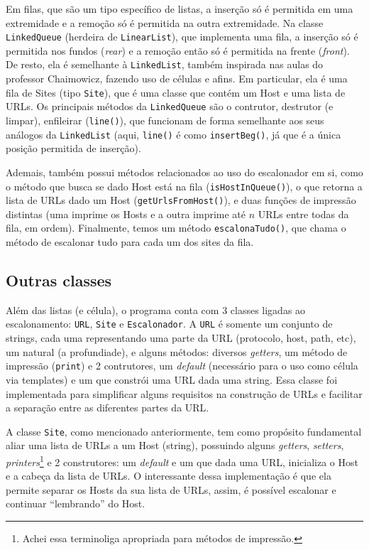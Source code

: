 \documentclass{article}
\def\code#1{\texttt{#1}}
\begin{document}
Em filas, que são um tipo específico de listas, a inserção só é permitida em uma extremidade e a remoção só é permitida na outra extremidade. Na classe \code{LinkedQueue} (herdeira de \code{LinearList}), que implementa uma fila, a inserção só é permitida nos fundos (\textit{rear}) e a remoção então só é permitida na frente (\textit{front}). De resto, ela é semelhante à \code{LinkedList}, também inspirada nas aulas do professor Chaimowicz, fazendo uso de células e afins. Em particular, ela é uma fila de Sites (tipo \code{Site}), que é uma classe que contém um Host e uma lista de URLs. Os principais métodos da \code{LinkedQueue} são o contrutor, destrutor (e limpar), enfileirar (\code{line()}), que funcionam de forma semelhante aos seus análogos da \code{LinkedList} (aqui, \code{line()} é como \code{insertBeg()}, já que é a única posição permitida de inserção).

Ademais, também possui métodos relacionados ao uso do escalonador em si, como o método que busca se dado Host está na fila (\code{isHostInQueue()}), o que retorna a lista de URLs dado um Host (\code{getUrlsFromHost()}), e duas funções de impressão distintas (uma imprime os Hosts e a outra imprime até \( n \) URLs entre todas da fila, em ordem). Finalmente, temos um método \code{escalonaTudo()}, que chama o método de escalonar tudo para cada um dos sites da fila.

\subsection{Outras classes}

Além das listas (e célula), o programa conta com 3 classes ligadas ao escalonamento: \code{URL}, \code{Site} e \code{Escalonador}. A \code{URL} é somente um conjunto de strings, cada uma representando uma parte da URL (protocolo, host, path, etc), um natural (a profundiade), e alguns métodos: diversos \textit{getters}, um método de impressão (\code{print}) e 2 contrutores, um \textit{default} (necessário para o uso como célula via templates) e um que constrói uma URL dada uma string. Essa classe foi implementada para simplificar alguns requisitos na construção de URLs e facilitar a separação entre as diferentes partes da URL.

A classe \code{Site}, como mencionado anteriormente, tem como propósito fundamental aliar uma lista de URLs a um Host (string), possuindo alguns \textit{getters}, \textit{setters}, \textit{printers}\footnote{Achei essa terminoliga apropriada para métodos de impressão.} e 2 construtores: um \textit{default} e um que dada uma URL, inicializa o Host e a cabeça da lista de URLs. O interessante dessa implementação é que ela permite separar os Hosts da sua lista de URLs, assim, é possível escalonar e continuar ``lembrando'' do Host.
\end{document}
